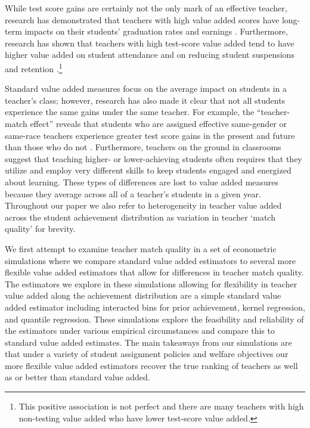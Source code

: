 \documentclass[letterpaper,12pt]{article}
\begin{document}
While test score gains are certainly not the only mark of an effective teacher, research has demonstrated that teachers with high value added scores have long-term impacts on their students' graduation rates and earnings \citep{chetty2014measuring2}. Furthermore, research has shown that teachers with high test-score value added tend to have higher value added on student attendance and on reducing student suspensions and retention \citep{pope2017multidimensional}.\footnote{This positive association is not perfect and there are many teachers with high non-testing value added who have lower test-score value added.} 

Standard value added measures focus on the average impact on students in a teacher's class; however, research has also made it clear that not all students experience the same gains under the same teacher. For example, the ``teacher-match effect'' reveals that students who are assigned effective same-gender or same-race teachers experience greater test score gains in the present and future than those who do not \citep{dee2005teacher,delhommer2019highschool}. Furthermore, teachers on the ground in classrooms suggest that teaching higher- or lower-achieving students often requires that they utilize and employ very different skills to keep students engaged and energized about learning. These types of differences are lost to value added measures because they average across all of a teacher's students in a given year. Throughout our paper we also refer to heterogeneity in teacher value added across the student achievement distribution as variation in teacher `match quality' for brevity.

We first attempt to examine teacher match quality in a set of econometric simulations where we compare standard value added estimators to several more flexible value added estimators that allow for differences in teacher match quality. The estimators we explore in these simulations allowing for flexibility in teacher value added along the achievement distribution are a simple standard value added estimator including interacted bins for prior achievement, kernel regression, and quantile regression. These simulations explore the feasibility and reliability of the estimators under various empirical circumstances and compare this to standard value added estimates. The main takeaways from our simulations are that under a variety of student assignment policies and welfare objectives our more flexible value added estimators recover the true ranking of teachers as well as or better than standard value added.
\end{document}
